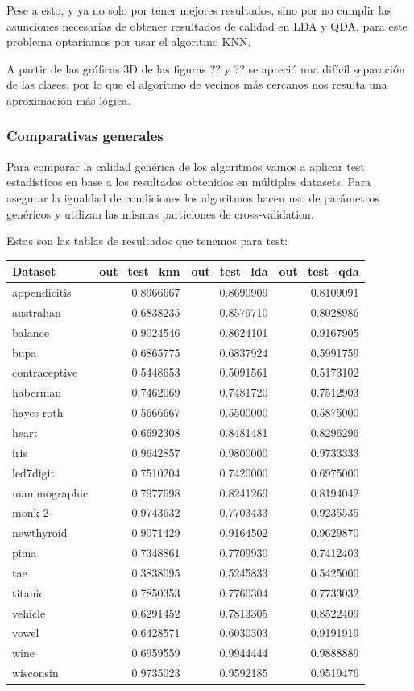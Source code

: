 Pese a esto, y ya no solo por tener mejores resultados, sino por no cumplir las asunciones necesarias de obtener resultados de calidad en LDA y QDA, para este problema optaríamos por usar el algoritmo KNN.

A partir de las gráficas 3D de las figuras ?? y ?? se apreció una difícil separación de las clases, por lo que el algoritmo de vecinos más cercanos nos resulta una aproximación más lógica.

\subsubsection{Comparativas generales}

Para comparar la calidad genérica de los algoritmos vamos a aplicar test estadísticos en base a los resultados obtenidos en múltiples datasets. Para asegurar la igualdad de condiciones los algoritmos hacen uso de parámetros genéricos y utilizan las mismas particiones de cross-validation.

\vspace{\baselineskip}

Estas son las tablas de resultados que tenemos para test:

\begin{tabular}{l|r|r|r}
\hline
Dataset & out\_test\_knn & out\_test\_lda & out\_test\_qda\\
\hline
appendicitis & 0.8966667 & 0.8690909 & 0.8109091\\
\hline
australian & 0.6838235 & 0.8579710 & 0.8028986\\
\hline
balance & 0.9024546 & 0.8624101 & 0.9167905\\
\hline
bupa & 0.6865775 & 0.6837924 & 0.5991759\\
\hline
contraceptive & 0.5448653 & 0.5091561 & 0.5173102\\
\hline
haberman & 0.7462069 & 0.7481720 & 0.7512903\\
\hline
hayes-roth & 0.5666667 & 0.5500000 & 0.5875000\\
\hline
heart & 0.6692308 & 0.8481481 & 0.8296296\\
\hline
iris & 0.9642857 & 0.9800000 & 0.9733333\\
\hline
led7digit & 0.7510204 & 0.7420000 & 0.6975000\\
\hline
mammographic & 0.7977698 & 0.8241269 & 0.8194042\\
\hline
monk-2 & 0.9743632 & 0.7703433 & 0.9235535\\
\hline
newthyroid & 0.9071429 & 0.9164502 & 0.9629870\\
\hline
pima & 0.7348861 & 0.7709930 & 0.7412403\\
\hline
tae & 0.3838095 & 0.5245833 & 0.5425000\\
\hline
titanic & 0.7850353 & 0.7760304 & 0.7733032\\
\hline
vehicle & 0.6291452 & 0.7813305 & 0.8522409\\
\hline
vowel & 0.6428571 & 0.6030303 & 0.9191919\\
\hline
wine & 0.6959559 & 0.9944444 & 0.9888889\\
\hline
wisconsin & 0.9735023 & 0.9592185 & 0.9519476\\
\hline
\end{tabular}

